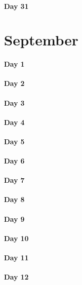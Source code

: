 \documentclass[UTF8,a4paper,8pt]{ctexart}
\begin{document}
 	 \paragraph{Day 31      \quad     }
\section{September}
 	 \paragraph{Day 1       \quad     }
 	 \paragraph{Day 2       \quad     }
 	 \paragraph{Day 3       \quad     }
 	 \paragraph{Day 4       \quad     }
 	 \paragraph{Day 5       \quad     }
 	 \paragraph{Day 6       \quad     }
 	 \paragraph{Day 7       \quad     }
 	 \paragraph{Day 8       \quad     }
 	 \paragraph{Day 9       \quad     }
 	 \paragraph{Day 10      \quad     }
 	 \paragraph{Day 11      \quad     }
 	 \paragraph{Day 12      \quad     }
\end{document}
